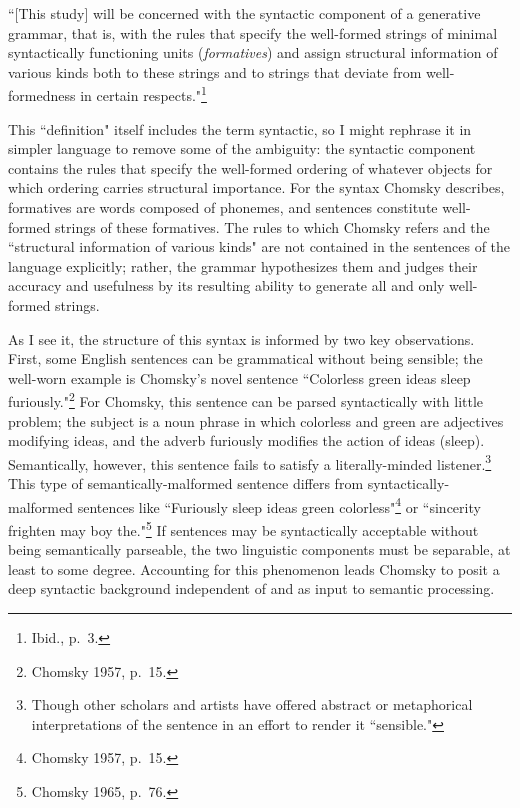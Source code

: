 ``[This study] will be concerned with the syntactic component of a generative grammar, that is, with the rules that specify the well-formed strings of minimal syntactically functioning units (\emph{formatives}) and assign structural information of various kinds both to these strings and to strings that deviate from well-formedness in certain respects."\footnote{Ibid., p.\ 3.}

This ``definition" itself includes the term syntactic, so I might rephrase it in simpler language to remove some of the ambiguity: the syntactic component contains the rules that specify the well-formed ordering of whatever objects for which ordering carries structural importance.  For the syntax Chomsky describes, formatives are words composed of phonemes, and sentences constitute well-formed strings of these formatives.  The rules to which Chomsky refers and the ``structural information of various kinds" are not contained in the sentences of the language explicitly; rather, the grammar hypothesizes them and judges their accuracy and usefulness by its resulting ability to generate all and only well-formed strings.

As I see it, the structure of this syntax is informed by two key observations.  First, some English sentences can be grammatical without being sensible; the well-worn example is Chomsky's novel sentence ``Colorless green ideas sleep furiously."\footnote{Chomsky 1957, p.\ 15.}  For Chomsky, this sentence can be parsed syntactically with little problem; the subject is a noun phrase in which colorless and green are adjectives modifying ideas, and the adverb furiously modifies the action of ideas (sleep).  Semantically, however, this sentence fails to satisfy a literally-minded listener.\footnote{Though other scholars and artists have offered abstract or metaphorical interpretations of the sentence in an effort to render it ``sensible."}  This type of semantically-malformed sentence differs from syntactically-malformed sentences like ``Furiously sleep ideas green colorless"\footnote{Chomsky 1957, p.\ 15.} or ``sincerity frighten may boy the."\footnote{Chomsky 1965, p.\ 76.}  If sentences may be syntactically acceptable without being semantically parseable, the two linguistic components must be separable, at least to some degree.  Accounting for this phenomenon leads Chomsky to posit a deep syntactic background independent of and as input to semantic processing.

